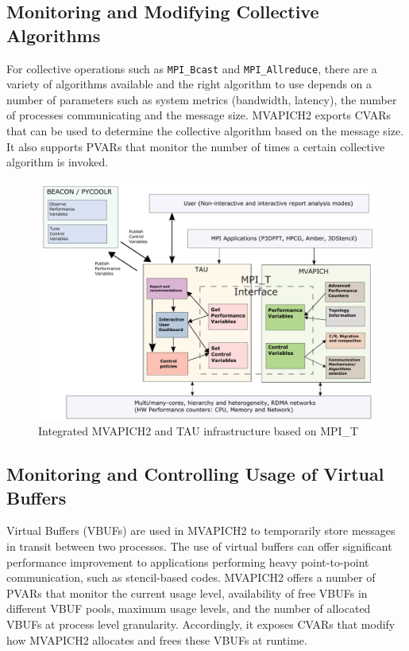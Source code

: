 \subsection {Monitoring and Modifying Collective Algorithms} 
For collective operations such as \verb+MPI_Bcast+ and \verb+MPI_Allreduce+, there are a variety of algorithms available and the right algorithm to use depends on a number of parameters such as system metrics (bandwidth, latency), the number of processes communicating and the message size. MVAPICH2 exports CVARs that can be used to determine the collective algorithm based on the message size. It also supports PVARs that monitor the number of times a certain collective algorithm is invoked.
\begin{center}
	\begin{figure}[tbp!]
         \centering
		\includegraphics[scale=0.3, width=\columnwidth, keepaspectratio]{figures/MPI_T_infrastructure}
		\caption{Integrated MVAPICH2 and TAU infrastructure based on MPI\_T}
		\label{fig:mpitinfrastructure}
	\end{figure}
\end{center}

\subsection {Monitoring and Controlling Usage of Virtual Buffers} 
Virtual Buffers (VBUFs) are used in MVAPICH2 to temporarily store messages in transit between two processes. The use of virtual buffers can offer significant performance improvement to applications performing heavy point-to-point communication, such as stencil-based codes. MVAPICH2 offers a number of PVARs that monitor the current usage level, availability of free VBUFs in different VBUF pools, maximum usage levels, and the number of allocated VBUFs at process level granularity. Accordingly, it exposes CVARs that modify how MVAPICH2 allocates and frees these VBUFs at runtime.

